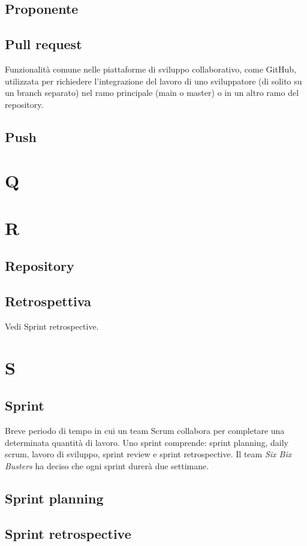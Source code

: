     \subsection{Proponente}
    \subsection{Pull request}
    Funzionalità comune nelle piattaforme di sviluppo collaborativo, come GitHub, utilizzata per 
    richiedere l'integrazione del lavoro di uno sviluppatore (di solito su un branch separato) 
    nel ramo principale (main o master) o in un altro ramo del repository.
    \subsection{Push}

\section{Q}
\section{R}
    \subsection{Repository}
    \subsection{Retrospettiva}
    Vedi Sprint retrospective.
\section{S}
    \subsection{Sprint}
    Breve periodo di tempo in cui un team Scrum collabora per completare 
    una determinata quantità di lavoro. Uno sprint comprende:  
    sprint planning, daily scrum, lavoro di sviluppo, 
    sprint review e sprint retrospective. Il team \textit{Six Bix Busters} ha 
    deciso che ogni sprint durerà due settimane.   
    \subsection{Sprint planning}
    \subsection{Sprint retrospective}
